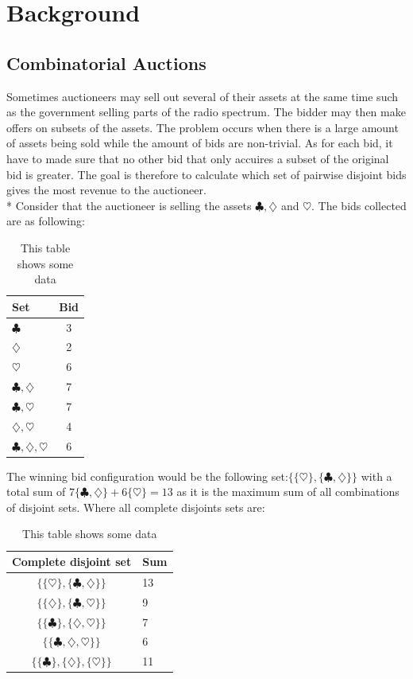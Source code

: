 \documentclass[a4paper, 12pt]{report}
\begin{document}
\section{Background}
\subsection{Combinatorial Auctions}
Sometimes auctioneers may sell out several of their assets at the same time such as the government selling parts of the radio spectrum. The bidder may then make offers on subsets of the assets. The problem occurs when there is a large amount of assets being sold while the amount of bids are non-trivial. As for each bid, it have to made sure that no other bid that only accuires a subset of the original bid is greater.
The goal is therefore to calculate which set of pairwise disjoint bids gives the most revenue to the auctioneer.\\*
\newpage
 Consider that the auctioneer is selling the assets $\clubsuit , \diamondsuit$ and $\heartsuit$. The bids collected are as following:

\begin{table}[htb]
\centering
\begin{tabular}{ l | c}
\hline  
Set & Bid \\
\hline
$\clubsuit$ & 3 \\
$\diamondsuit$ & 2 \\
$\heartsuit$ & 6 \\
$\clubsuit, \diamondsuit$ & 7 \\
$\clubsuit, \heartsuit$ & 7 \\
$\diamondsuit, \heartsuit$ & 4 \\
$\clubsuit, \diamondsuit, \heartsuit$ & 6 \\
\end{tabular}
\caption{This table shows some data}
\label{tab:bids}
\end{table}
The winning bid configuration would be the following set:$ \{\{\heartsuit\},\{\clubsuit , \diamondsuit\}\}$ with a total sum of $7 \{\clubsuit , \diamondsuit\}+6 \{\heartsuit\} = 13$ as it is the maximum sum of all combinations of disjoint sets. Where all complete disjoints sets are:

\begin{table}[htb]
\centering
\begin{tabular}{c | l }
\hline
Complete disjoint set & Sum\\
\hline
$\{\{\heartsuit \},\{\clubsuit , \diamondsuit \}\} $ & 13 \\
$\{\{\diamondsuit \},\{\clubsuit , \heartsuit \}\} $ & 9 \\
$\{\{\clubsuit \},\{\diamondsuit , \heartsuit \}\} $ & 7 \\

$\{\{\clubsuit,\diamondsuit , \heartsuit \}\} $ & 6 \\
$\{\{\clubsuit \},\{\diamondsuit \}, \{ \heartsuit \}\} $ &  11
\end{tabular}
\caption{This table shows some data}
\label{tab:disjoint}
\end{table}
\end{document}
